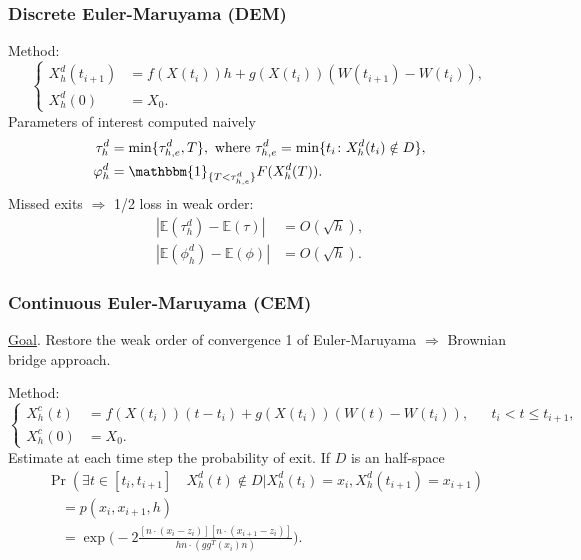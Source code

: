 \begin{frame} %
\frametitle{Discrete Euler-Maruyama (DEM)}
Method:
\begin{equation*}
	\left \{
	\begin{aligned}
		X_h^d(t_{i+1}) &= f(X(t_i))h + g(X(t_i))(W(t_{i+1}) - W(t_{i})),  \\
		X_h^d(0) &= X_0.
	\end{aligned} \right .
\end{equation*}
Parameters of interest computed naively
\begin{equation*}
\begin{aligned}
	\tau_h^d &= \min\{\tau_{h,e}^d,T\}, \text{ where } \tau_{h,e}^d = \min \{t_i \colon X_h^d(t_i) \notin D\}, \\
	\phi_h^d &= \mathbbm{1}_{\{T < \tau_{h,e}^d\}}F(X_h^d(T)).
\end{aligned}
\end{equation*}
Missed exits $\Rightarrow$ 1/2 loss in weak order:
\begin{align*}
	|\mathbb{E}(\tau_h^d) - \mathbb{E}(\tau)| &= O(\sqrt{h}), \\
	|\mathbb{E}(\phi_h^d) - \mathbb{E}(\phi)| &= O(\sqrt{h}).
\end{align*}	
\end{frame}

\begin{frame} %
\frametitle{Continuous Euler-Maruyama (CEM)}
\underline{Goal}. Restore the weak order of convergence 1 of Euler-Maruyama $\Rightarrow$ Brownian bridge approach.

Method:
\begin{equation*}
	\left \{
	\begin{aligned}
		X_h^c(t) &= f(X(t_i))(t-t_i) + g(X(t_i))(W(t) - W(t_{i})),  && t_i < t \leq t_{i+1},\\
		X_h^c(0) &= X_0.
	\end{aligned} \right .
\end{equation*} 
Estimate at each time step the probability of exit. If $D$ is an half-space
\begin{equation*}
\begin{aligned}
	&\Pr (\exists t \in [ t_i,t_{i+1} ] \quad X_h^d(t) \notin D | X_h^d(t_i) = x_i, X_h^d(t_{i+1}) = x_{i+1}) \\
	&\quad = p(x_i,x_{i+1},h) \\
	&\quad = \exp\Big(-2\frac{[n\cdot(x_i - z_i)][n\cdot(x_{i+1} - z_i)]}{hn\cdot (gg^T(x_i)n)}\Big).
\end{aligned}
\end{equation*}
\end{frame}

